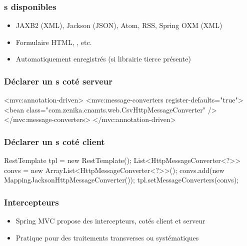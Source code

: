 \begin{frame}
 \frametitle{s disponibles}
 
 \begin{itemize}
  \item JAXB2 (XML), Jackson (JSON), Atom, RSS, Spring OXM (XML)
  \item Formulaire HTML, , etc.
  \item Automatiquement enregistrés (si librairie tierce présente)
 \end{itemize}

\end{frame} 

\begin{frame}[fragile]
 \frametitle{Déclarer un s coté serveur} 
 
 \begin{xmlcode}
<mvc:annotation-driven>
  <mvc:message-converters register-defaults="true">
    <bean class="com.zenika.cnamts.web.CsvHttpMessageConverter" />
  </mvc:message-converters>
</mvc:annotation-driven>
 \end{xmlcode}

\end{frame} 

\begin{frame}[fragile]
 \frametitle{Déclarer un s coté client} 
 
 \begin{javacode}
RestTemplate tpl = new RestTemplate();
List<HttpMessageConverter<?>> convs = 
  new ArrayList<HttpMessageConverter<?>>();
convs.add(new MappingJacksonHttpMessageConverter());
tpl.setMessageConverters(convs);
 \end{javacode}

\end{frame} 

\begin{frame}
 \frametitle{Intercepteurs} 
 
 \begin{itemize}
  \item Spring MVC propose des intercepteurs, cotés client et serveur
  \item Pratique pour des traitements transverses ou systématiques
 \end{itemize}

\end{frame} 

